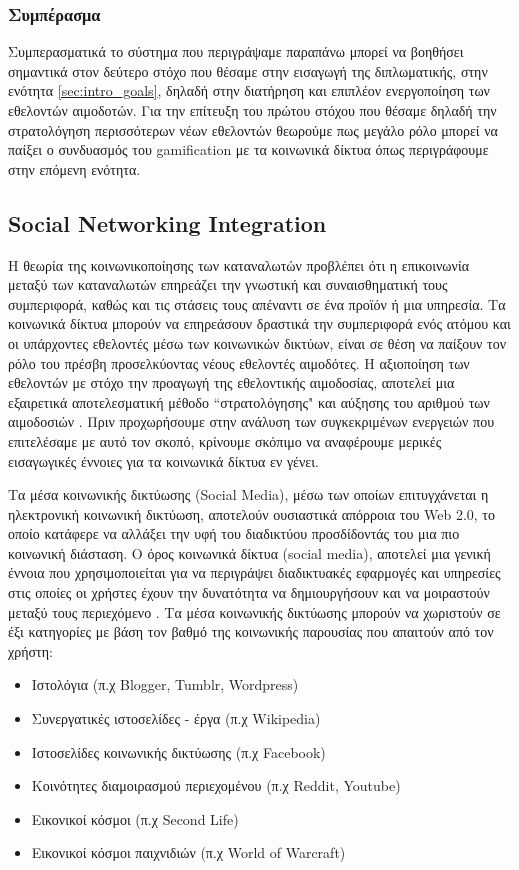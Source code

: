 	\subsubsection{Συμπέρασμα}
	Συμπερασματικά το σύστημα που περιγράψαμε παραπάνω μπορεί να βοηθήσει σημαντικά στον δεύτερο στόχο που θέσαμε στην εισαγωγή της διπλωματικής, στην ενότητα \ref{sec:intro_goals}, δηλαδή στην διατήρηση και επιπλέον ενεργοποίηση των εθελοντών αιμοδοτών. Για την επίτευξη του πρώτου στόχου που θέσαμε δηλαδή την στρατολόγηση περισσότερων νέων εθελοντών θεωρούμε πως μεγάλο ρόλο μπορεί να παίξει ο συνδυασμός του gamification με τα κοινωνικά δίκτυα όπως περιγράφουμε στην επόμενη ενότητα.
	
	\subsection{Social Networking Integration}\label{ssec:social_netowrks_system_analysis}
	Η θεωρία της κοινωνικοποίησης των καταναλωτών προβλέπει ότι η επικοινωνία μεταξύ των καταναλωτών επηρεάζει την γνωστική και συναισθηματική τους συμπεριφορά, καθώς και τις στάσεις τους απέναντι σε ένα προϊόν ή μια υπηρεσία\cite{1974}. Τα κοινωνικά δίκτυα μπορούν να επηρεάσουν δραστικά την συμπεριφορά ενός ατόμου\cite{shaver2007impact} και οι υπάρχοντες εθελοντές μέσω των κοινωνικών δικτύων, είναι σε θέση να παίξουν τον ρόλο του πρέσβη προσελκύοντας νέους εθελοντές αιμοδότες. Η αξιοποίηση των εθελοντών με στόχο την προαγωγή της εθελοντικής αιμοδοσίας, αποτελεί μια εξαιρετικά αποτελεσματική μέθοδο ``στρατολόγησης" και αύξησης του αριθμού των αιμοδοσιών \cite{Lemmens2008}. Πριν προχωρήσουμε στην ανάλυση των συγκεκριμένων ενεργειών που επιτελέσαμε με αυτό τον σκοπό, κρίνουμε σκόπιμο να αναφέρουμε μερικές εισαγωγικές έννοιες για τα κοινωνικά δίκτυα εν γένει. 	
	
	Τα μέσα κοινωνικής δικτύωσης (Social Media), μέσω των οποίων επιτυγχάνεται η ηλεκτρονική κοινωνική δικτύωση, αποτελούν ουσιαστικά απόρροια του Web 2.0, το οποίο κατάφερε να αλλάξει την υφή του διαδικτύου προσδίδοντάς του μια πιο κοινωνική διάσταση. Ο όρος κοινωνικά δίκτυα (social media), αποτελεί μια γενική έννοια που χρησιμοποιείται για να περιγράψει διαδικτυακές εφαρμογές και υπηρεσίες στις οποίες οι χρήστες έχουν την δυνατότητα να δημιουργήσουν και να μοιραστούν μεταξύ τους περιεχόμενο \cite{Kaplan201059}. Τα μέσα κοινωνικής δικτύωσης μπορούν να χωριστούν σε έξι κατηγορίες με βάση τον βαθμό της κοινωνικής παρουσίας που απαιτούν από τον χρήστη:
	\begin{itemize}
		\item Ιστολόγια (π.χ Blogger, Tumblr, Wordpress)
		\item Συνεργατικές ιστοσελίδες - έργα (π.χ Wikipedia)
		\item Ιστοσελίδες κοινωνικής δικτύωσης (π.χ Facebook)
		\item Κοινότητες διαμοιρασμού περιεχομένου (π.χ Reddit, Youtube)
		\item Εικονικοί κόσμοι (π.χ Second Life)
		\item Εικονικοί κόσμοι παιχνιδιών (π.χ World of Warcraft)
	\end{itemize}
	
